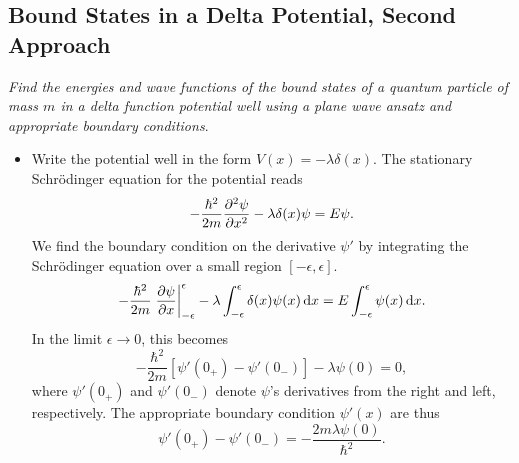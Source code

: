 \documentclass[11pt, a4paper]{article}
\newcommand{\diff}{\mathop{}\!\mathrm{d}} %
\newcommand{\Schro}{Schr\"{o}dinger\xspace}
\begin{document}
\subsection{Bound States in a Delta Potential, Second Approach}
\textit{Find the energies and wave functions of the bound states of a quantum particle of mass $ m $ in a delta function potential well using a plane wave ansatz and appropriate boundary conditions}. 
\begin{itemize}
	\item Write the potential well in the form $ V(x) = - \lambda \delta (x) $. The stationary \Schro equation for the potential reads
	\begin{equation*}
		- \frac{\hbar^{2}}{2m}\pdv[2]{\psi}{x} - \lambda \delta(x) \psi = E\psi.
	\end{equation*}
	We find the boundary condition on the derivative $ \psi' $ by integrating the \Schro equation over a small region $ [-\epsilon, \epsilon] $. 
	\begin{equation*}
		-\frac{\hbar^{2}}{2m} \eval{\pdv{\psi}{x}}_{-\epsilon}^{\epsilon} - \lambda \int_{-\epsilon}^{\epsilon} \delta(x) \psi(x)\diff x = E \int_{-\epsilon}^{\epsilon}\psi(x) \diff x.
	\end{equation*}
	In the limit $ \epsilon \to 0 $, this becomes
	\begin{equation*}
		-\frac{\hbar^{2}}{2m} \left[\psi'(0_{+}) - \psi'(0_{-})\right] - \lambda \psi(0) = 0,
	\end{equation*}
	where $ \psi'(0_{+}) $ and $ \psi'(0_{-}) $ denote $ \psi $'s derivatives from the right and left, respectively. The appropriate boundary condition $ \psi'(x) $ are thus
	\begin{equation*}
		\psi'(0_{+}) - \psi'(0_{-}) = -\frac{2m\lambda\psi(0)}{\hbar^{2}}.
	\end{equation*}
	

\end{itemize}
\end{document}
